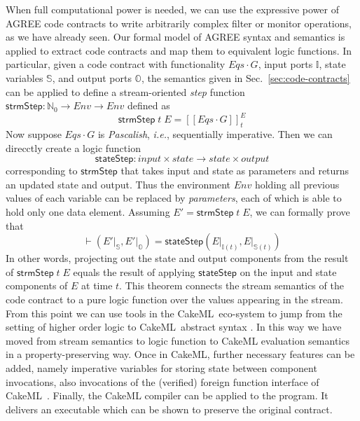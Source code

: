 \documentclass[global,twocolumn]{svjour}
\newcommand{\konst}[1]{\ensuremath{\mathsf{#1}}}
\newcommand{\sem}[1]{\ensuremath{[\![ #1 ]\!]}}
\newcommand{\Eqs}{\ensuremath{\mathit{Eqs}}}
\newcommand{\secref}[1]{Sec.~\ref{#1}}
\newcommand{\ckml}{CakeML}
\newcommand{\ie}{\textit{i.e.}}
\begin{document}
When full computational power is needed, we can use the expressive power of AGREE code contracts to write arbitrarily complex filter or monitor operations, as we have already seen.
%
Our formal model of AGREE syntax and semantics is applied to extract code contracts and map them to equivalent logic functions.
%
In particular, given a code contract with functionality ${\Eqs}\cdot G$, input ports $\mathbb{I}$, state variables $\mathbb{S}$, and output ports $\mathbb{O}$, the semantics given in \secref{sec:code-contracts} can be applied to define a stream-oriented \emph{step} function $\konst{strmStep} : \mathbb{N}_0 \to \mathit{Env} \to \mathit{Env}$ defined as
%
\[
 \konst{strmStep}\;t \; E = \sem{\mathit{Eqs} \cdot G}^E_t
\]
%
Now suppose ${\Eqs}\cdot G$ is \emph{Pascalish}, \ie, sequentially imperative.
%
Then we can direcctly create a logic function
%
\[
\konst{stateStep} : \mathit{input} \times \mathit{state} \to \mathit{state} \times \mathit{output}
\]
%
corresponding to \konst{strmStep} that takes input and state as parameters and returns an updated state and output.
%
Thus the environment $\mathit{Env}$ holding all previous values of each variable can be replaced by \emph{parameters}, each of which is able to hold only one data element.
%
Assuming $\mathit{E}' = \konst{strmStep}\;t\; \mathit{E}$, we can formally prove that
%
\[
\vdash (\mathit{E}' \vert_{\mathbb{S}},
 \mathit{E}' \vert_{\mathbb{O}}) =
\konst{stateStep} (\mathit{E}\vert_{\mathbb{I}(t)},
                   \mathit{E}\vert_{\mathbb{S}(t)})
\]
%
In other words, projecting out the state and output components from the result of $\konst{strmStep}\;t\; \mathit{E}$ equals the result of applying \konst{stateStep} on the input and state components of $\mathit{E}$ at time $t$.
%
This theorem connects the stream semantics of the code contract to a pure logic function over the values appearing in the stream.
%
From this point we can use tools in the \ckml\ eco-system to jump from the setting of higher order logic to \ckml\ abstract syntax \cite{cakeml-translator}.
%
In this way we have moved from stream semantics to logic function to CakeML evaluation semantics in a property-preserving way.
%
Once in \ckml, further necessary features can be added, namely imperative variables for storing state between component invocations, also invocations of the (verified) foreign function interface of \ckml\ \cite{cakeml-monadic}.
%
Finally, the CakeML compiler can be applied to the program.
%
It delivers an executable which can be shown to preserve the original contract.
\end{document}
